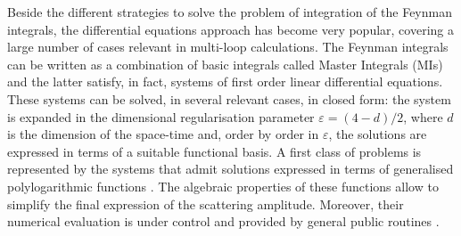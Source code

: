 \documentclass[final,1p,times]{elsarticle}
\begin{document}
Beside the different strategies to solve the problem of integration of the Feynman integrals, the differential equations approach \cite{Kotikov:1990kg,Kotikov:1991pm,Bern:1993kr,Remiddi:1997ny,Gehrmann:1999as,Argeri:2007up,Henn:2013pwa,Henn:2014qga} has become very popular, covering a large number of cases relevant in multi-loop calculations.
The Feynman integrals can be written as a combination of basic integrals called Master Integrals (MIs) and the latter satisfy, in fact, systems of first order linear differential equations. These systems can be solved, in several relevant cases, in closed form: the system is expanded in the dimensional regularisation parameter $\varepsilon=(4-d)/2$, where $d$ is the dimension of the space-time and, order by order in $\varepsilon$, the solutions are expressed in terms of a suitable functional basis. A first class of problems is represented by the systems that admit solutions expressed in terms of 
generalised polylogarithmic functions \cite{Goncharov:polylog,Goncharov:1998kja,Goncharov:2001iea,Remiddi:1999ew}.
%
%
The algebraic properties of these functions allow to simplify the final expression of the scattering amplitude. Moreover, their numerical evaluation is under control and provided by general public routines \cite{Gehrmann:2001pz,Gehrmann:2001jv,Bauer:2000cp,Vollinga:2004sn,Bonciani:2010ms,Naterop:2019xaf}.
%
%
\end{document}
